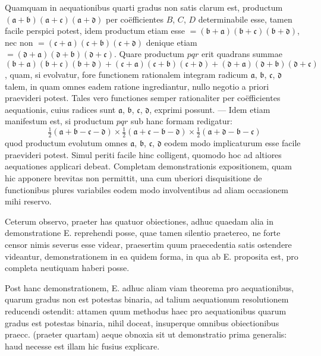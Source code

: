 \documentclass[14pt]{memoir}
\theoremstyle{plain}
\theoremstyle{remark}
\begin{document}
Quamquam in aequationibus quarti gradus non satis clarum est, productum \( (\mathfrak{a} + \mathfrak{b})(\mathfrak{a} + \mathfrak{c})(\mathfrak{a} + \mathfrak{d})\) per co\"efficientes \(B\), \(C\), \(D\) determinabile esse, tamen facile perspici potest, idem productum etiam esse \(= (\mathfrak{b} + \mathfrak{a})(\mathfrak{b} + \mathfrak{c})(\mathfrak{b} + \mathfrak{d})\), nec non \( = (\mathfrak{c} + \mathfrak{a})(\mathfrak{c} + \mathfrak{b})(\mathfrak{c} + \mathfrak{d})\) denique etiam \( = (\mathfrak{d} + \mathfrak{a})(\mathfrak{d} + \mathfrak{b})(\mathfrak{d} + \mathfrak{c})\). Quare productum \(pqr\) erit quadrans summae \((\mathfrak{b} + \mathfrak{a})(\mathfrak{b} + \mathfrak{c})(\mathfrak{b} + \mathfrak{d})+(\mathfrak{c} + \mathfrak{a})(\mathfrak{c} + \mathfrak{b})(\mathfrak{c} + \mathfrak{d})+(\mathfrak{d} + \mathfrak{a})(\mathfrak{d} + \mathfrak{b})(\mathfrak{d} + \mathfrak{c})\), quam, si evolvatur, fore functionem rationalem integram radicum \(\mathfrak{a}\), \(\mathfrak{b}\), \(\mathfrak{c}\), \(\mathfrak{d}\) talem, in quam omnes eadem ratione ingrediantur, nullo negotio a priori praevideri potest.  Tales vero functiones semper rationaliter per co\"efficientes aequationis, cuius radices sunt \(\mathfrak{a}\), \(\mathfrak{b}\), \(\mathfrak{c}\), \(\mathfrak{d}\), exprimi possunt. — Idem etiam manifestum est, si productum \(pqr\)  sub hanc formam redigatur:
\[ \tfrac{1}{2}\left( \mathfrak{a} + \mathfrak{b} - \mathfrak{c} - \mathfrak{d}  \right) \times  \tfrac{1}{2}\left( \mathfrak{a} + \mathfrak{c} - \mathfrak{b} - \mathfrak{d}  \right)  \times  \tfrac{1}{2}\left( \mathfrak{a} + \mathfrak{d} - \mathfrak{b} - \mathfrak{c}  \right)  \]
quod productum evolutum omnes \(\mathfrak{a}\), \(\mathfrak{b}\), \(\mathfrak{c}\), \(\mathfrak{d}\) eodem modo implicaturum esse facile praevideri potest.   Simul periti facile hinc colligent, quomodo hoc ad altiores aequationes applicari debeat.   Completam demonstrationis expositionem, quam hic apponere brevitas non permittit, una cum uberiori disquisitione de functionibus plures variabiles eodem modo involventibus ad aliam occasionem mihi reservo.

Ceterum observo, praeter has quatuor obiectiones, adhuc quaedam alia in demonstratione \textsc{E.} reprehendi posse, quae tamen silentio praetereo, ne forte censor nimis severus esse videar, praesertim quum praecedentia satis ostendere videantur, demonstrationem in ea quidem forma, in qua ab \textsc{E.} proposita est, pro completa neutiquam haberi posse.

Post hanc demonstrationem, \textsc{E.} adhuc aliam viam theorema pro aequationibus, quarum gradus non est potestas binaria, ad talium aequationum resolutionem reducendi ostendit: attamen quum methodus haec pro aequationibus quarum gradus est potestas binaria, nihil doceat, insuperque omnibus obiectionibus praecc. (praeter quartam) aeque obnoxia sit ut demonstratio prima generalis: haud necesse est illam hic fusius explicare.
 
\end{document}
